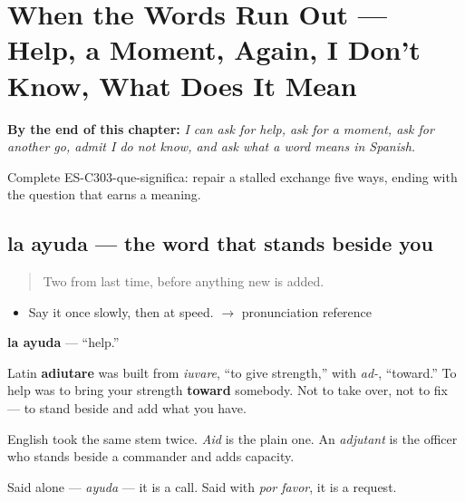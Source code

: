 
\chapter{When the Words Run Out --- Help, a Moment, Again, I Don't Know, What Does It Mean}
\label{ch:reparaciones}

\begin{chapteropening}
\textbf{By the end of this chapter:} \emph{I can ask for help, ask for a moment, ask for another go, admit I do not know, and ask what a word means in Spanish.}

Complete ES-C303-que-significa: repair a stalled exchange five ways, ending with the question that earns a meaning.
\end{chapteropening}

\section[la ayuda]{la ayuda — the word that stands beside you}

\label{lesson:ES-C303-ayuda}



\begin{quote}
Two from last time, before anything new is added.
\end{quote}

\begin{sounds}
\begin{itemize}
\raggedright
  \item Say it once slowly, then at speed. $\to$ pronunciation reference
\end{itemize}
\end{sounds}

\begin{cousinweb}
\textbf{la ayuda} — \textquotedblleft{}help.\textquotedblright{}

Latin \textbf{adiutare} was built from \emph{iuvare}, \textquotedblleft{}to give strength,\textquotedblright{} with \emph{ad-}, \textquotedblleft{}toward.\textquotedblright{} To help was to bring your strength \textbf{toward} somebody. Not to take over, not to fix — to stand beside and add what you have.

English took the same stem twice. \emph{Aid} is the plain one. An \emph{adjutant} is the officer who stands beside a commander and adds capacity.

Said alone — \emph{ayuda} — it is a call. Said with \emph{por favor}, it is a request.
\end{cousinweb}

